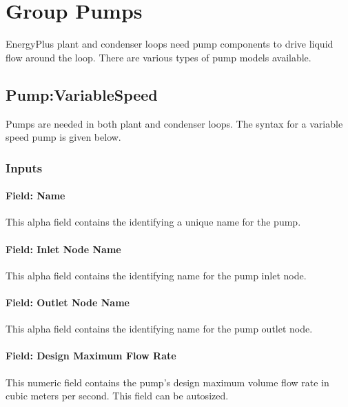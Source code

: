 \section{Group Pumps}\label{group-pumps}

EnergyPlus plant and condenser loops need pump components to drive liquid flow around the loop. There are various types of pump models available.

\subsection{Pump:VariableSpeed}\label{pumpvariablespeed}

Pumps are needed in both plant and condenser loops. The syntax for a variable speed pump is given below.

\subsubsection{Inputs}\label{inputs-037}

\paragraph{Field: Name}\label{field-name-036}

This alpha field contains the identifying a unique name for the pump.

\paragraph{Field: Inlet Node Name}\label{field-inlet-node-name-005}

This alpha field contains the identifying name for the pump inlet node.

\paragraph{Field: Outlet Node Name}\label{field-outlet-node-name-006}

This alpha field contains the identifying name for the pump outlet node.

\paragraph{Field: Design Maximum Flow Rate}\label{field-design-maximum-flow-rate}

This numeric field contains the pump's design maximum volume flow rate in cubic meters per second. This field can be autosized.

